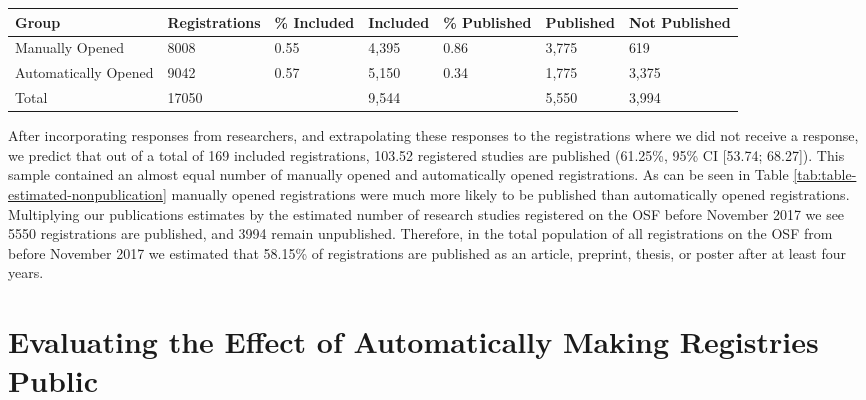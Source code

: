 \documentclass[
  ,jou, a4paper,floatsintext]{apa6}
\begin{document}
\begin{table*}[tbp]

\begin{center}
\begin{threeparttable}

\caption{\label{tab:table-estimated-nonpublication}Estimated number of published and unpublished studies registered on the OSF before November 2017.}

\begin{tabular}{lllllll}
\toprule
Group & \multicolumn{1}{c}{Registrations} & \multicolumn{1}{c}{\% Included} & \multicolumn{1}{c}{Included} & \multicolumn{1}{c}{\% Published} & \multicolumn{1}{c}{Published} & \multicolumn{1}{c}{Not Published}\\
\midrule
Manually Opened & 8008 & 0.55 & 4,395 & 0.86 & 3,775 & 619\\
Automatically Opened & 9042 & 0.57 & 5,150 & 0.34 & 1,775 & 3,375\\
Total & 17050 &  & 9,544 &  & 5,550 & 3,994\\
\bottomrule
\end{tabular}

\end{threeparttable}
\end{center}

\end{table*}

After incorporating responses from researchers, and extrapolating these responses to the registrations where we did not receive a response, we predict that out of a total of 169 included registrations, 103.52 registered studies are published (61.25\%, 95\% CI {[}53.74; 68.27{]}). This sample contained an almost equal number of manually opened and automatically opened registrations. As can be seen in Table \ref{tab:table-estimated-nonpublication} manually opened registrations were much more likely to be published than automatically opened registrations. Multiplying our publications estimates by the estimated number of research studies registered on the OSF before November 2017 we see 5550 registrations are published, and 3994 remain unpublished. Therefore, in the total population of all registrations on the OSF from before November 2017 we estimated that 58.15\% of registrations are published as an article, preprint, thesis, or poster after at least four years.

\hypertarget{evaluating-the-effect-of-automatically-making-registries-public}{%
\section{Evaluating the Effect of Automatically Making Registries Public}\label{evaluating-the-effect-of-automatically-making-registries-public}}
\end{document}
